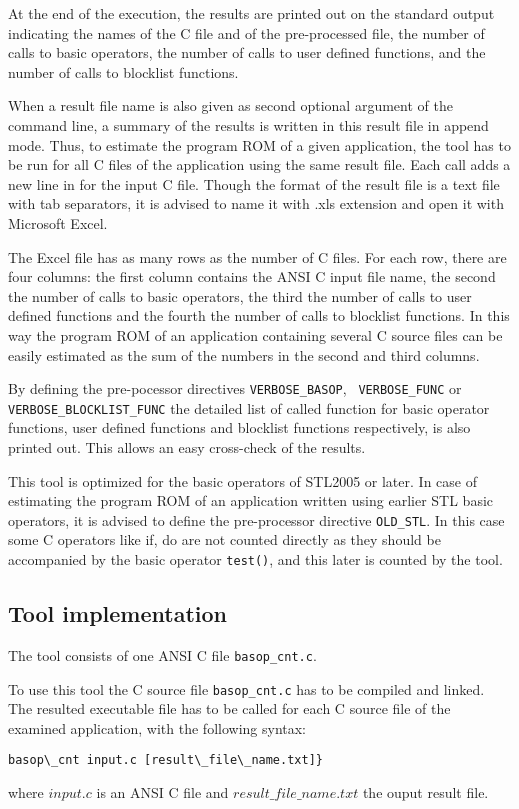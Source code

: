 At the end of the execution, the results are printed out on the
standard output indicating the names of the C file and of the
pre-processed file, the number of calls to basic operators, the number
of calls to user defined functions, and the number of calls to
blocklist functions.

When a result file name is also given as second optional argument of
the command line, a summary of the results is written in this result
file in append mode. Thus, to estimate the program ROM of a given
application, the tool has to be run for all C files of the application
using the same result file. Each call adds a new line in for the input
C file. Though the format of the result file is a text file with tab
separators, it is advised to name it with .xls extension and open it
with Microsoft Excel.

The Excel file has as many rows as the number of C files. For each
row, there are four columns: the first column contains the ANSI C
input file name, the second the number of calls to basic operators,
the third the number of calls to user defined functions and the fourth
the number of calls to blocklist functions. In this way the program
ROM of an application containing several C source files can be easily
estimated as the sum of the numbers in the second and third columns.

By defining the pre-pocessor directives {\tt VERBOSE\_BASOP}, {\tt
VERBOSE\_FUNC} or\\ {\tt VERBOSE\_BLOCKLIST\_FUNC} the detailed list
of called function for basic operator functions, user defined
functions and blocklist functions respectively, is also printed
out. This allows an easy cross-check of the results.

This tool is optimized for the basic operators of STL2005 or later. In
case of estimating the program ROM of an application written using
earlier STL basic operators, it is advised to define the pre-processor
directive {\tt OLD\_STL}. In this case some C operators like if, do
are not counted directly as they should be accompanied by the basic
operator {\tt test()}, and this later is counted by the tool.

\subsection{Tool implementation}
The tool consists of one ANSI C file {\tt basop\_cnt.c}.

To use this tool the C source file {\tt basop\_cnt.c} has to be
compiled and linked. The resulted executable file has to be called for
each C source file of the examined application, with the following
syntax:
\begin{verbatim}
basop\_cnt input.c [result\_file\_name.txt]}
\end{verbatim}
where $input.c$ is an ANSI C file and $result\_file\_name.txt$ the
ouput result file.

